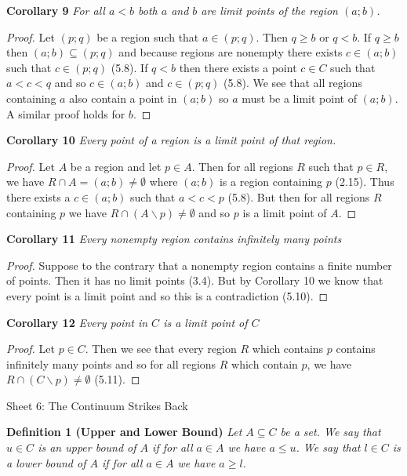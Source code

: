 \documentclass{article}
\begin{document}
\begin{flushleft}
\textbf{Corollary 9}
\textsl{For all $a<b$ both $a$ and $b$ are limit points of the region $(a;b)$.}
\begin{proof}
Let $(p;q)$ be a region such that $a \in (p;q)$. Then $q \geq b$ or $q<b$. If $q \geq b$ then $(a;b) \subseteq (p;q)$ and because regions are nonempty there exists $c \in (a;b)$ such that $c \in (p;q)$ (5.8). If $q<b$ then there exists a point $c \in C$ such that $a < c < q$ and so $c \in (a;b)$ and $c \in (p;q)$ (5.8). We see that all regions containing $a$ also contain a point in $(a;b)$ so $a$ must be a limit point of $(a;b)$. A similar proof holds for $b$.
\end{proof}

\textbf{Corollary 10}
\textsl{Every point of a region is a limit point of that region.}
\begin{proof}
Let $A$ be a region and let $p \in A$. Then for all regions $R$ such that $p \in R$, we have $R \cap A = (a;b) \neq \emptyset$ where $(a;b)$ is a region containing $p$ (2.15). Thus there exists a $c \in (a;b)$ such that $a<c<p$ (5.8). But then for all regions $R$ containing $p$ we have $R \cap (A \backslash p) \neq \emptyset$ and so $p$ is a limit point of $A$.
\end{proof}

\textbf{Corollary 11}
\textsl{Every nonempty region contains infinitely many points}
\begin{proof}
Suppose to the contrary that a nonempty region contains a finite number of points. Then it has no limit points (3.4). But by Corollary 10 we know that every point is a limit point and so this is a contradiction (5.10).
\end{proof}

\textbf{Corollary 12}
\textsl{Every point in $C$ is a limit point of $C$}
\begin{proof}
Let $p \in C$. Then we see that every region $R$ which contains $p$ contains infinitely many points and so for all regions $R$ which contain $p$, we have $R \cap (C \backslash p) \neq \emptyset$ (5.11).
\end{proof}
\newpage

\Large

Sheet 6: The Continuum Strikes Back\newline

\normalsize

\textbf{Definition 1 (Upper and Lower Bound)}
\textsl{Let $A \subseteq C$ be a set. We say that $u \in C$ is an upper bound of $A$ if for all $a \in A$ we have $a \leq u$. We say that $l \in C$ is a lower bound of $A$ if for all $a \in A$ we have $a \geq l$.}\newline


\end{flushleft}
\end{document}
